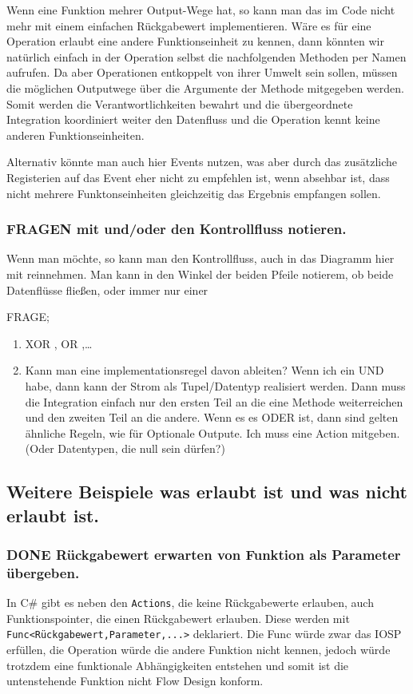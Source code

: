 \documentclass[11pt]{article}
\begin{document}
Wenn eine Funktion mehrer Output-Wege hat, so kann man das im Code nicht mehr mit einem einfachen Rückgabewert implementieren.
Wäre es für eine Operation erlaubt eine andere Funktionseinheit zu kennen, dann könnten wir natürlich einfach in der Operation selbst
die nachfolgenden Methoden per Namen aufrufen. Da aber Operationen entkoppelt von ihrer Umwelt sein sollen, müssen die möglichen
Outputwege über die Argumente der Methode mitgegeben werden. Somit werden die Verantwortlichkeiten bewahrt und die übergeordnete 
Integration koordiniert weiter den Datenfluss und die Operation kennt keine anderen Funktionseinheiten.

Alternativ könnte man auch hier Events nutzen, was aber durch das zusätzliche
Registerien auf das Event eher nicht zu empfehlen ist, wenn absehbar ist, dass
nicht mehrere Funktonseinheiten gleichzeitig das Ergebnis empfangen sollen.

\subsubsection{{\bfseries\sffamily FRAGEN} mit und/oder den Kontrollfluss notieren.}
\label{sec:orgheadline33}
Wenn man möchte, so kann man den Kontrollfluss, auch in das Diagramm hier mit
reinnehmen. Man kann in den Winkel der beiden Pfeile notierem, ob beide
Datenflüsse fließen, oder immer nur einer 

FRAGE; 
\begin{enumerate}
\item XOR , OR ,\ldots{}
\item Kann man eine implementationsregel davon ableiten?
Wenn ich ein UND habe, dann kann der Strom als Tupel/Datentyp realisiert
werden. Dann muss die Integration einfach nur den ersten Teil an die eine
Methode weiterreichen und den zweiten Teil an die andere.
Wenn es es ODER ist, dann sind gelten ähnliche Regeln, wie für Optionale
Outpute.
Ich muss eine Action mitgeben. (Oder Datentypen, die null sein dürfen?)
\end{enumerate}

\subsection{Weitere Beispiele was erlaubt ist und was nicht erlaubt ist.}
\label{sec:orgheadline37}
\subsubsection{{\bfseries\sffamily DONE} Rückgabewert erwarten von Funktion als Parameter übergeben.}
\label{sec:orgheadline35}
In C\# gibt es neben den \texttt{Actions}, die keine Rückgabewerte erlauben, auch Funktionspointer, die einen Rückgabewert erlauben. 
Diese werden mit \texttt{Func<Rückgabewert,Parameter,...>} deklariert.
Die Func würde zwar das IOSP erfüllen, die Operation würde die andere Funktion nicht kennen,
jedoch würde trotzdem eine funktionale Abhängigkeiten entstehen und somit ist die untenstehende Funktion nicht Flow Design konform.
\end{document}
